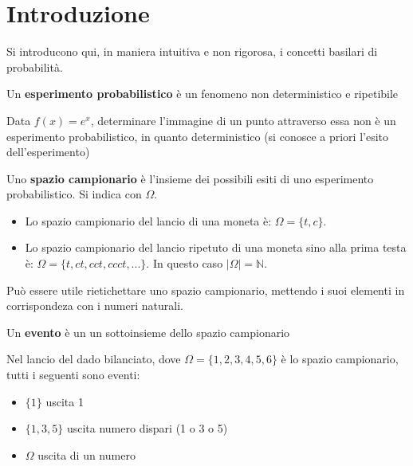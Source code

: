 \section{Introduzione}
Si introducono qui, in maniera intuitiva e non rigorosa, i concetti basilari di probabilità.
\theoremstyle{definition}
\begin{definition}
Un \textbf{esperimento probabilistico} è un fenomeno non deterministico e ripetibile
\end{definition}
\begin{example}
Data $f(x)$\(=e^x\), determinare l'immagine di un punto attraverso essa non è un esperimento probabilistico, in quanto deterministico (si conosce a priori l'esito dell'esperimento)
\end{example}

\begin{definition}
Uno \textbf{spazio campionario} è l'insieme dei possibili esiti di uno esperimento probabilistico. Si indica con \(\Omega\).
\end{definition}
\begin{example}
\hspace{2px}
\begin{itemize}
    \item Lo spazio campionario del lancio di una moneta è: \(\Omega=\{t,c\}\).
    \item Lo spazio campionario del lancio ripetuto di una moneta sino alla prima testa è: \(\Omega=\{t,ct,cct,ccct,...\}\).
    In questo caso \(|\Omega|=\mathbb{N}\).
\end{itemize}
\end{example}

Può essere utile rietichettare uno spazio campionario, mettendo i suoi elementi in corrispondeza con i numeri naturali.

\begin{definition}
Un \textbf{evento} è un un sottoinsieme dello spazio campionario
\end{definition}

\begin{example}
Nel lancio del dado bilanciato, dove \(\Omega=\{1,2,3,4,5,6\}\) è lo spazio campionario, tutti i seguenti sono eventi:
\begin{itemize}
    \item \(\{1\}\) uscita 1
    \item \(\{1,3,5\}\) uscita numero dispari (1 o 3 o 5)
    \item \(\Omega\) uscita di un numero
\end{itemize}
\end{example}


